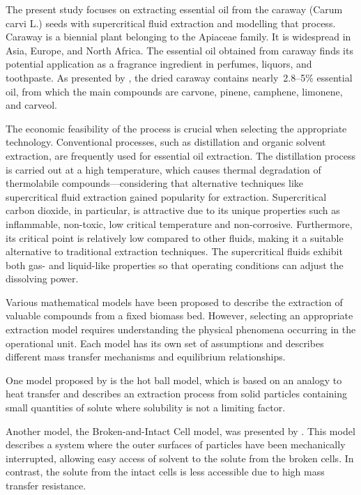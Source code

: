 \documentclass[../Article_Model_Parameters.tex]{subfiles}
\begin{document}
	
	The present study focuses on extracting essential oil from the caraway (Carum carvi L.) seeds with supercritical fluid extraction and modelling that process. Caraway is a biennial plant belonging to the Apiaceae family. It is widespread in Asia, Europe, and North Africa. The essential oil obtained from caraway finds its potential application as a fragrance ingredient in perfumes, liquors, and toothpaste. As presented by \citet{Hromis2015}, the dried caraway contains nearly~2.8–5\% essential oil, from which the main compounds are carvone, pinene, camphene, limonene, and carveol. 
	
	The economic feasibility of the process is crucial when selecting the appropriate technology. Conventional processes, such as distillation and organic solvent extraction, are frequently used for essential oil extraction. The distillation process is carried out at a high temperature, which causes thermal degradation of thermolabile compounds—considering that alternative techniques like supercritical fluid extraction gained popularity for extraction. Supercritical carbon dioxide, in particular, is attractive due to its unique properties such as inflammable, non-toxic, low critical temperature and non-corrosive. Furthermore, its critical point is relatively low compared to other fluids, making it a suitable alternative to traditional extraction techniques. The supercritical fluids exhibit both gas- and liquid-like properties so that operating conditions can adjust the dissolving power.
	
	Various mathematical models have been proposed to describe the extraction of valuable compounds from a fixed biomass bed. However, selecting an appropriate extraction model requires understanding the physical phenomena occurring in the operational unit. Each model has its own set of assumptions and describes different mass transfer mechanisms and equilibrium relationships.
	
	One model proposed by \citet{Reverchon1993} is the hot ball model, which is based on an analogy to heat transfer and describes an extraction process from solid particles containing small quantities of solute where solubility is not a limiting factor. 
	
	Another model, the Broken-and-Intact Cell model, was presented by \citet{Sovova1994}. This model describes a system where the outer surfaces of particles have been mechanically interrupted, allowing easy access of solvent to the solute from the broken cells. In contrast, the solute from the intact cells is less accessible due to high mass transfer resistance.
	
\end{document}
